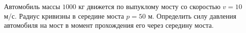Автомобиль массы $1000$ кг движется по выпуклому мосту
со скоростью $v = 10$ м/с.
Радиус кривизны в середине моста $p = 50$ м.
Определить силу давления автомобиля на мост
в момент прохождения его через середину моста.
